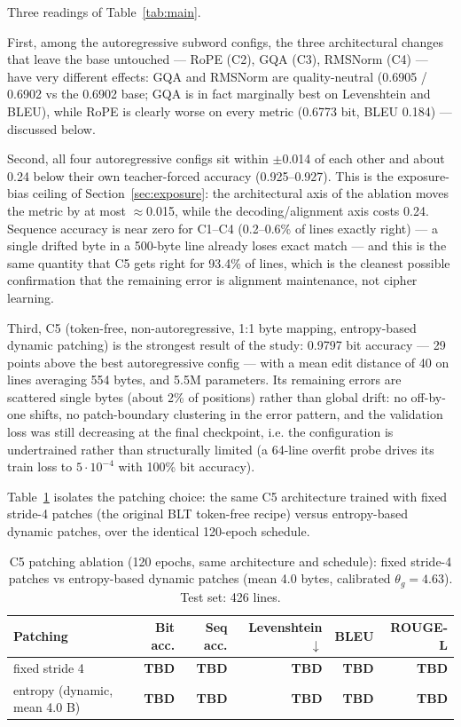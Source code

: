 \documentclass[11pt]{article}
\begin{document}
Three readings of Table~\ref{tab:main}.

First, among the autoregressive subword configs, the three architectural changes
that leave the base untouched --- RoPE (C2), GQA (C3), RMSNorm (C4) --- have very
different effects: GQA and RMSNorm are quality-neutral (0.6905 / 0.6902 vs the
0.6902 base; GQA is in fact marginally best on Levenshtein and BLEU), while RoPE
is clearly worse on every metric (0.6773 bit, BLEU 0.184) --- discussed below.

Second, all four autoregressive configs sit within $\pm$0.014 of each other and
about 0.24 below their own teacher-forced accuracy (0.925--0.927). This is the
exposure-bias ceiling of Section~\ref{sec:exposure}: the architectural axis of the
ablation moves the metric by at most $\approx$0.015, while the
decoding/alignment axis costs 0.24. Sequence accuracy is near zero for
C1--C4 (0.2--0.6\% of lines exactly right) --- a single drifted byte in a
500-byte line already loses exact match --- and this is the same quantity that
C5 gets right for 93.4\% of lines, which is the cleanest possible confirmation
that the remaining error is alignment maintenance, not cipher learning.

Third, C5 (token-free, non-autoregressive, 1:1 byte mapping, entropy-based
dynamic patching) is the strongest result of the study: 0.9797 bit accuracy ---
29 points above the best autoregressive config --- with a mean edit distance of
40 on lines averaging 554 bytes, and 5.5M parameters. Its remaining errors are
scattered single bytes (about 2\% of positions) rather than global drift: no
off-by-one shifts, no patch-boundary clustering in the error pattern, and the
validation loss was still decreasing at the final checkpoint, i.e. the
configuration is undertrained rather than structurally limited (a 64-line
overfit probe drives its train loss to $5{\cdot}10^{-4}$ with 100\% bit
accuracy). %

Table~\ref{tab:c5patch} isolates the patching choice: the same C5 architecture
trained with fixed stride-4 patches (the original BLT token-free recipe) versus
entropy-based dynamic patches, over the identical 120-epoch schedule.

\begin{table}[h]
\centering
\caption{C5 patching ablation (120 epochs, same architecture and schedule): fixed
stride-4 patches vs entropy-based dynamic patches (mean 4.0 bytes, calibrated
$\theta_g{=}4.63$). Test set: 426 lines.}
\label{tab:c5patch}
\begin{tabular}{lrrrrr}
\toprule
Patching & Bit acc. & Seq acc. & Levenshtein $\downarrow$ & BLEU & ROUGE-L \\
\midrule
fixed stride 4                  & \textbf{TBD} & \textbf{TBD} & \textbf{TBD} & \textbf{TBD} & \textbf{TBD} \\
entropy (dynamic, mean 4.0 B)   & \textbf{TBD} & \textbf{TBD} & \textbf{TBD} & \textbf{TBD} & \textbf{TBD} \\
\bottomrule
\end{tabular}
\end{table}
\end{document}
